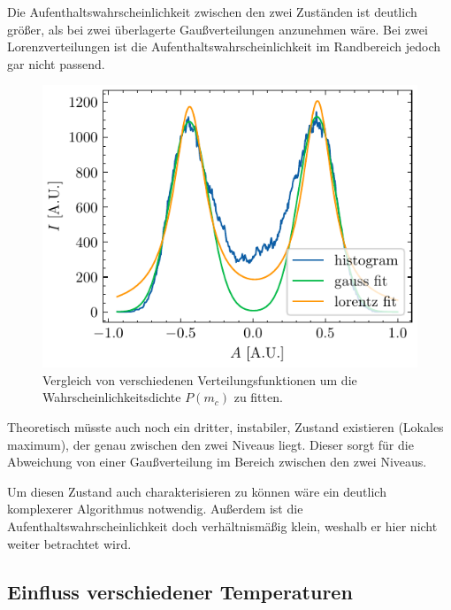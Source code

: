 \documentclass[main.tex]{subfiles}
\begin{document}
Die Aufenthaltswahrscheinlichkeit zwischen den zwei Zuständen ist deutlich größer, als bei zwei überlagerte Gaußverteilungen anzunehmen wäre. Bei zwei Lorenzverteilungen ist die Aufenthaltswahrscheinlichkeit im Randbereich jedoch gar nicht passend.

\begin{figure}[H]
    \centering
    \includegraphics{bilder/plots/theo-vis/hist_fit_comp.pdf}
    \caption{Vergleich von verschiedenen Verteilungsfunktionen um die Wahrscheinlichkeitsdichte $P(m_c)$ zu fitten.}\label{fig:fit_func_comp}
\end{figure}

Theoretisch müsste auch noch ein dritter, instabiler, Zustand existieren (Lokales maximum), der genau zwischen den zwei Niveaus liegt. Dieser sorgt für die Abweichung von einer Gaußverteilung im Bereich zwischen den zwei Niveaus. 

Um diesen Zustand auch charakterisieren zu können wäre ein deutlich komplexerer Algorithmus notwendig. Außerdem ist die Aufenthaltswahrscheinlichkeit doch verhältnismäßig klein, weshalb er hier nicht weiter betrachtet wird.

\subsection{Einfluss verschiedener Temperaturen}

\end{document}
